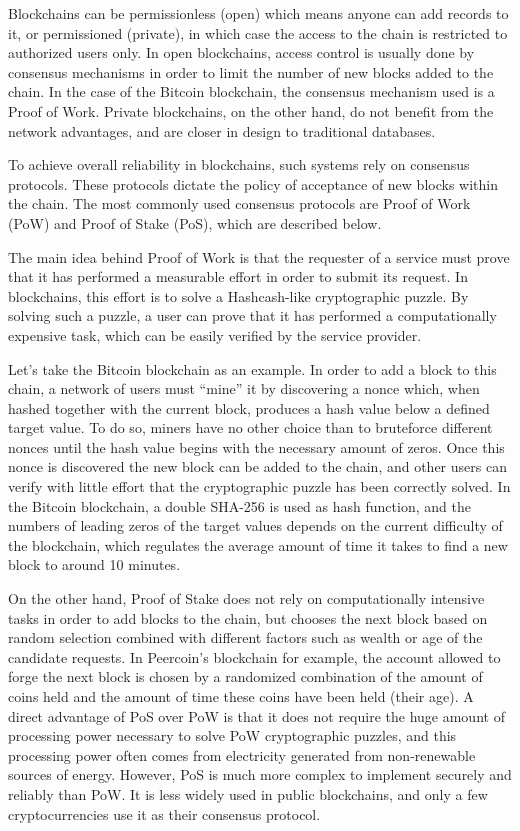 \documentclass{article}
\begin{document}
\bigskip

Blockchains can be permissionless (open) which means anyone can add records to it, or permissioned (private), in which case the access to the chain is restricted to authorized users only. In open blockchains, access control is usually done by consensus mechanisms in order to limit the number of new blocks added to the chain. In the case of the Bitcoin blockchain, the consensus mechanism used is a Proof of Work.
Private blockchains, on the other hand, do not benefit from the network advantages, and are closer in design to traditional databases.

\bigskip

To achieve overall reliability in blockchains, such systems rely on consensus protocols. These protocols dictate the policy of acceptance of new blocks within the chain. The most commonly used consensus protocols are Proof of Work (PoW) and Proof of Stake (PoS), which are described below.

\bigskip

The main idea behind Proof of Work is that the requester of a service must prove that it has performed a measurable effort in order to submit its request. In blockchains, this effort is to solve a Hashcash-like\cite{back2002hashcash} cryptographic puzzle. By solving such a puzzle, a user can prove that it has performed a computationally expensive task, which can be easily verified by the service provider.


Let's take the Bitcoin blockchain as an example. In order to add a block to this chain, a network of users must ``mine'' it by discovering a nonce which, when hashed together with the current block, produces a hash value below a defined target value. To do so, miners have no other choice than to bruteforce different nonces until the hash value begins with the necessary amount of zeros. Once this nonce is discovered the new block can be added to the chain, and other users can verify with little effort that the cryptographic puzzle has been correctly solved. In the Bitcoin blockchain, a double SHA-256 is used as hash function, and the numbers of leading zeros of the target values depends on the current difficulty of the blockchain, which regulates the average amount of time it takes to find a new block to around 10 minutes.

\bigskip

On the other hand, Proof of Stake does not rely on computationally intensive tasks in order to add blocks to the chain, but chooses the next block based on random selection combined with different factors such as wealth or age of the candidate requests. In Peercoin's blockchain for example, the account allowed to forge the next block is chosen by a randomized combination of the amount of coins held and the amount of time these coins have been held (their age). A direct advantage of PoS over PoW is that it does not require the huge amount of processing power necessary to solve PoW cryptographic puzzles, and this processing power often comes from electricity generated from non-renewable sources of energy. However, PoS is much more complex to implement securely and reliably than PoW. It is less widely used in public blockchains, and only a few cryptocurrencies use it as their consensus protocol.
\end{document}
